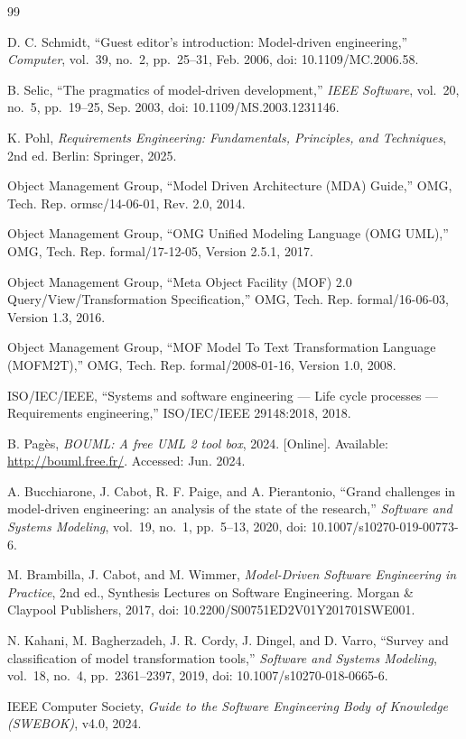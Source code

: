 \documentclass[12pt,a4paper]{article}
\begin{document}
\begin{thebibliography}{99}

D. C. Schmidt, ``Guest editor's introduction: Model-driven engineering,'' \emph{Computer}, vol.~39, no.~2, pp.~25--31, Feb. 2006, doi: 10.1109/MC.2006.58.

B. Selic, ``The pragmatics of model-driven development,'' \emph{IEEE Software}, vol.~20, no.~5, pp.~19--25, Sep. 2003, doi: 10.1109/MS.2003.1231146.

K. Pohl, \emph{Requirements Engineering: Fundamentals, Principles, and Techniques}, 2nd ed. Berlin: Springer, 2025.

Object Management Group, ``Model Driven Architecture (MDA) Guide,'' OMG, Tech. Rep. ormsc/14-06-01, Rev. 2.0, 2014.

Object Management Group, ``OMG Unified Modeling Language (OMG UML),'' OMG, Tech. Rep. formal/17-12-05, Version 2.5.1, 2017.

Object Management Group, ``Meta Object Facility (MOF) 2.0 Query/View/Transformation Specification,'' OMG, Tech. Rep. formal/16-06-03, Version 1.3, 2016.

Object Management Group, ``MOF Model To Text Transformation Language (MOFM2T),'' OMG, Tech. Rep. formal/2008-01-16, Version 1.0, 2008.

ISO/IEC/IEEE, ``Systems and software engineering --- Life cycle processes --- Requirements engineering,'' ISO/IEC/IEEE 29148:2018, 2018.

B. Pagès, \emph{BOUML: A free UML 2 tool box}, 2024. [Online]. Available: \url{http://bouml.free.fr/}. Accessed: Jun. 2024.

A. Bucchiarone, J. Cabot, R. F. Paige, and A. Pierantonio, ``Grand challenges in model-driven engineering: an analysis of the state of the research,'' \emph{Software and Systems Modeling}, vol.~19, no.~1, pp.~5--13, 2020, doi: 10.1007/s10270-019-00773-6.

M. Brambilla, J. Cabot, and M. Wimmer, \emph{Model-Driven Software Engineering in Practice}, 2nd ed., Synthesis Lectures on Software Engineering. Morgan \& Claypool Publishers, 2017, doi: 10.2200/S00751ED2V01Y201701SWE001.

N. Kahani, M. Bagherzadeh, J. R. Cordy, J. Dingel, and D. Varro, ``Survey and classification of model transformation tools,'' \emph{Software and Systems Modeling}, vol.~18, no.~4, pp.~2361--2397, 2019, doi: 10.1007/s10270-018-0665-6.

IEEE Computer Society, \emph{Guide to the Software Engineering Body of Knowledge (SWEBOK)}, v4.0, 2024.

\end{thebibliography}
\end{document}
